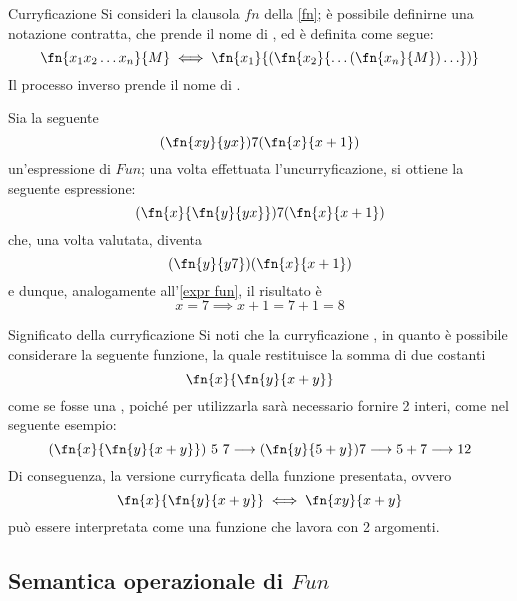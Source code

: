 \documentclass[a4paper, 12pt]{report}
\begin{document}
    \begin{frameddefn}{Curryficazione}
        Si consideri la clausola $fn$ della \cref{fn}; è possibile definirne una notazione contratta, che prende il nome di , ed è definita come segue: $$\fn{x_1x_2 \ldots x_n}{M} \iff \fn{x_1}{(\fn{x_2}{\ldots (\fn{x_n}{M}) \ldots})}$$ Il processo inverso prende il nome di .
    \end{frameddefn}

    \begin{example}[Curryficazioni]
        Sia la seguente $$(\fn{xy}{yx})7(\fn{x}{x+1})$$ un'espressione di $Fun$; una volta effettuata l'uncurryficazione, si ottiene la seguente espressione: $$(\fn{x}{\fn{y}{yx}})7(\fn{x}{x+1})$$ che, una volta valutata, diventa $$(\fn{y}{y7})(\fn{x}{x+1})$$ e dunque, analogamente all'\cref{expr fun}, il risultato è $$x= 7 \implies x+1 = 7 + 1= 8$$
    \end{example}

    \begin{framedobs}{Significato della curryficazione}
        Si noti che la curryficazione , in quanto è possibile considerare la seguente funzione, la quale restituisce la somma di due costanti $$\fn{x}{\fn{y}{x + y}}$$ come se fosse una , poiché per utilizzarla sarà necessario fornire 2 interi, come nel seguente esempio: $$(\fn{x}{\fn{y}{x + y}}) \ 5 \ 7 \longrightarrow (\fn{y}{5 + y})7 \longrightarrow 5 + 7 \longrightarrow 12$$ Di conseguenza, la versione curryficata della funzione presentata, ovvero $$\fn{x}{\fn{y}{x + y}} \iff \fn{xy}{x + y}$$ può essere interpretata come una funzione che lavora con 2 argomenti.
    \end{framedobs}

    \subsection{Semantica operazionale di $Fun$}
\end{document}
